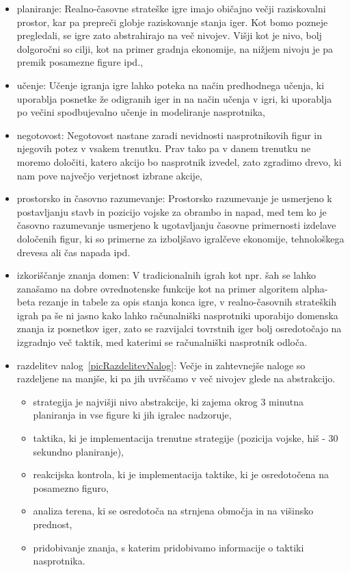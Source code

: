 \documentclass[a4paper, 12pt]{book}
\begin{document}
\begin{itemize}
	\item planiranje: Realno-časovne strateške igre imajo običajno večji raziskovalni prostor, kar pa prepreči globje raziskovanje stanja iger. Kot bomo pozneje pregledali, se igre zato abstrahirajo na več nivojev.
	Višji kot je nivo, bolj dolgoročni so cilji, kot na primer gradnja ekonomije, na nižjem nivoju je pa premik posamezne figure ipd.,
	\item učenje: Učenje igranja igre lahko poteka na način predhodnega učenja, ki uporablja posnetke že odigranih iger in na način učenja v igri, ki uporablja po večini spodbujevalno učenje in modeliranje nasprotnika,
	\item negotovost: Negotovost nastane zaradi nevidnosti nasprotnikovih figur in njegovih potez v vsakem trenutku. 
	Prav tako pa v danem trenutku ne moremo določiti, katero akcijo bo nasprotnik izvedel, zato zgradimo drevo, ki nam pove največjo verjetnost izbrane akcije,
	\item prostorsko in časovno razumevanje:
	Prostorsko razumevanje je usmerjeno k postavljanju stavb in pozicijo vojske za obrambo in napad, med tem ko je časovno razumevanje usmerjeno k ugotavljanju časovne primernosti izdelave določenih figur, ki so primerne za izboljšavo igralčeve ekonomije, tehnološkega drevesa ali čas napada ipd.

	\item izkoriščanje znanja domen: V tradicionalnih igrah kot npr. šah se lahko zanašamo na dobre ovrednotenske funkcije kot na primer algoritem alpha-beta rezanje in tabele za opis stanja konca igre, v realno-časovnih strateških igrah pa še ni jasno kako lahko računalniški nasprotniki uporabijo domenska znanja iz posnetkov iger, zato se razvijalci tovrstnih iger bolj osredotočajo na izgradnjo več taktik, med katerimi se računalniški nasprotnik odloča.
	\item razdelitev nalog~\ref{picRazdelitevNalog}:
	Večje in zahtevnejše naloge so razdeljene na manjše, ki pa jih uvrščamo v več nivojev glede na abstrakcijo.
	\begin{itemize}
		\item strategija je najvišji nivo abstrakcije, ki zajema okrog 3 minutna planiranja in vse figure ki jih igralec nadzoruje, 
		\item taktika, ki je implementacija trenutne strategije (pozicija vojske, hiš - 30 sekundno planiranje),
		\item reakcijska kontrola, ki je implementacija taktike, ki je osredotočena na posamezno figuro,
		\item analiza terena, ki se osredotoča na strnjena območja in na višinsko prednost,
		\item pridobivanje znanja, s katerim pridobivamo informacije o taktiki nasprotnika.


\end{itemize}
\end{itemize}
\end{document}
